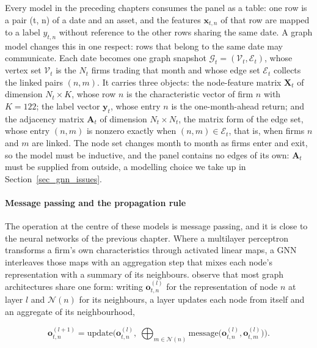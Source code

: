 Every model in the preceding chapters consumes the panel as a table: one row is a pair (t, n) of a date and an asset, and the features $\mathbf{x}_{t,n}$ of that row are mapped to a label $y_{t,n}$ without reference to the other rows sharing the same date. A graph model changes this in one respect: rows that belong to the same date may communicate. Each date becomes one graph snapshot $\mathcal{G}_t = (\mathcal{V}_t, \mathcal{E}_t)$, whose vertex set $\mathcal{V}_t$ is the $N_t$ firms trading that month and whose edge set $\mathcal{E}_t$ collects the linked pairs $(n,m)$. It carries three objects: the node-feature matrix $\mathbf{X}_t$ of dimension $N_t \times K$, whose row $n$ is the characteristic vector of firm $n$ with $K = 122$; the label vector $\mathbf{y}_t$, whose entry $n$ is the one-month-ahead return; and the adjacency matrix $\mathbf{A}_t$ of dimension $N_t \times N_t$, the matrix form of the edge set, whose entry $(n,m)$ is nonzero exactly when $(n,m) \in \mathcal{E}_t$, that is, when firms $n$ and $m$ are linked. The node set changes month to month as firms enter and exit, so the model must be inductive, and the panel contains no edges of its own: $\mathbf{A}_t$ must be supplied from outside, a modelling choice we take up in Section~\ref{sec_gnn_issues}.

\paragraph{Message passing and the propagation rule}\label{sec_gnn_message}

The operation at the centre of these models is message passing, and it is close to the neural networks of the previous chapter. Where a multilayer perceptron transforms a firm's own characteristics through activated linear maps, a GNN interleaves those maps with an aggregation step that mixes each node's representation with a summary of its neighbours. \cite{gilmer2017neural} observe that most graph architectures share one form: writing $\mathbf{o}_{t,n}^{(l)}$ for the representation of node $n$ at layer $l$ and $\mathcal{N}(n)$ for its neighbours, a layer updates each node from itself and an aggregate of its neighbourhood,

\begin{equation}
\label{eq_gnn_1}
\mathbf{o}_{t,n}^{(l+1)} = \text{update}\Big( \mathbf{o}_{t,n}^{(l)},\ \bigoplus_{m \in \mathcal{N}(n)} \text{message}\big(\mathbf{o}_{t,n}^{(l)}, \mathbf{o}_{t,m}^{(l)}\big) \Big).
\end{equation}

